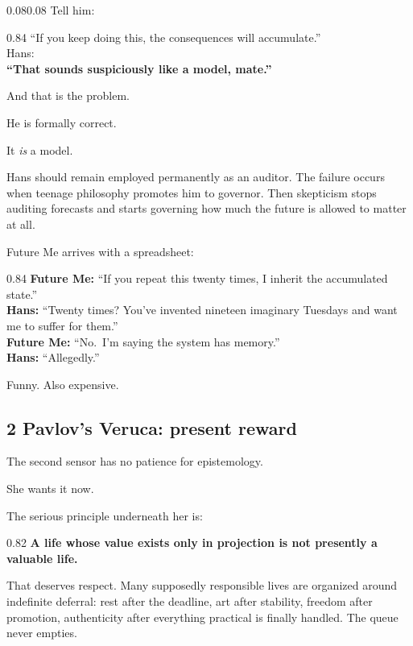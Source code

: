 \documentclass[10pt,letterpaper]{article}
\newenvironment{paperbody}
  {\begin{adjustwidth}{0.08\textwidth}{0.08\textwidth}\justifying}
  {\par\end{adjustwidth}}
\newenvironment{dialoguebox}
  {\Needspace{5\baselineskip}\par\vspace{0.26em}\begin{center}\begingroup
   \begin{lrbox}{\dialogueboxsave}\begin{varwidth}{0.84\linewidth}
   \small\rmfamily\upshape\RaggedRight}
  {\end{varwidth}\end{lrbox}\fbox{\usebox{\dialogueboxsave}}
   \endgroup\end{center}\vspace{0.26em}}
\newenvironment{thesisbox}
  {\Needspace{3.5\baselineskip}\par\vspace{0.32em}\begin{center}\begingroup
   \begin{lrbox}{\thesisboxsave}\begin{varwidth}{0.82\linewidth}
   \normalsize\rmfamily\bfseries\upshape\RaggedRight}
  {\end{varwidth}\end{lrbox}\fbox{\usebox{\thesisboxsave}}
   \endgroup\end{center}\vspace{0.32em}}
\let\oldsubsection\subsection
\renewcommand{\subsection}{\Needspace{5\baselineskip}\oldsubsection}
\begin{document}
\begin{paperbody}
Tell him:

\begin{dialoguebox}
``If you keep doing this, the consequences will accumulate.''\\[0.35em]
Hans:\\
\textbf{``That sounds suspiciously like a model, mate.''}
\end{dialoguebox}

And that is the problem.

He is formally correct.

It \emph{is} a model.

Hans should remain employed permanently as an auditor. The failure
occurs when teenage philosophy promotes him to governor. Then skepticism
stops auditing forecasts and starts governing how much the future is
allowed to matter at all.

Future Me arrives with a spreadsheet:

\begin{dialoguebox}
\textbf{Future Me:} ``If you repeat this twenty times, I inherit the
accumulated state.''\\[0.35em]
\textbf{Hans:} ``Twenty times? You've invented nineteen imaginary
Tuesdays and want me to suffer for them.''\\[0.35em]
\textbf{Future Me:} ``No.~I'm saying the system has memory.''\\[0.35em]
\textbf{Hans:} ``Allegedly.''
\end{dialoguebox}

Funny. Also expensive.

\subsection{2 Pavlov's Veruca: present
reward}\label{pavlovs-veruca-present-reward}

The second sensor has no patience for epistemology.

She wants it now.

The serious principle underneath her is:

\begin{thesisbox}
A life whose value exists only in projection is not presently a
valuable life.
\end{thesisbox}

That deserves respect. Many supposedly responsible lives are organized
around indefinite deferral: rest after the deadline, art after
stability, freedom after promotion, authenticity after everything
practical is finally handled. The queue never empties.


\end{paperbody}
\end{document}
